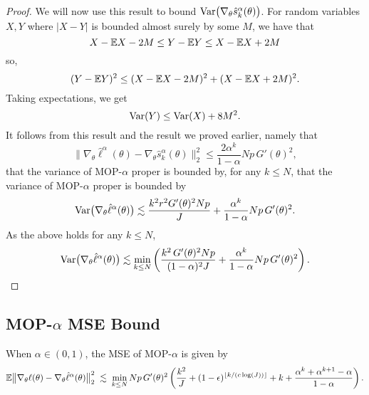 \begin{proof}
We will now use this result to bound $\mathrm{Var}\big(\nabla_\theta \hat s_k^\alpha(\theta)\big)$. 
For random variables $X,Y$ where $|X-Y|$ is bounded almost surely by some $M$, we have that 
\begin{equation}
X-\mathbb{E} X - 2M \leq Y - \mathbb{E} Y \leq X - \mathbb{E} X + 2M\end{equation}
so,
\begin{equation}
(Y-\mathbb{E} Y)^2 \leq (X-\mathbb{E} X - 2M)^2 + (X-\mathbb{E} X +2M)^2.\end{equation}
Taking expectations, we get
\begin{equation}
\mathrm{Var}(Y) \leq \mathrm{Var}(X) + 8M^2.
\end{equation}
It follows from this result and the result we proved earlier, namely that
\begin{equation}
\big\|\nabla_\theta\hat\ell^\alpha(\theta) - \nabla_\theta \hat s_k^\alpha(\theta)\big\|_2^2 \leq \frac{2\alpha^k}{1-\alpha}Np \, G'(\theta)^2,
\end{equation}
that the variance of MOP-$\alpha$ proper is bounded by, for any $k \leq N$,
that the variance of MOP-$\alpha$ proper is bounded by
\begin{equation}
\mathrm{Var}\big(\nabla_\theta \hat\ell^\alpha(\theta)\big) \lesssim \frac{k^2r^2G'(\theta)^2Np}{J} + \frac{\alpha^{k}}{1-\alpha}Np \, G'(\theta)^2.
\end{equation}
As the above holds for any $k \leq N$,
\begin{equation}
\mathrm{Var}\big(\nabla_\theta \hat\ell^\alpha(\theta)\big) \lesssim \min_{k\leq N} \left(\frac{k^2 \, G'(\theta)^2Np}{(1-\alpha)^2J} + \frac{\alpha^{k}}{1-\alpha}Np \, G'(\theta)^2 \right).\end{equation}
\end{proof}


\subsection{MOP-$\alpha$ MSE Bound}

\begin{thm}
    When $\alpha \in (0,1)$, the MSE of MOP-$\alpha$ is given by
    \begin{equation}
        \mathbb{E}\big\|\nabla_\theta\ell(\theta) - \nabla_\theta \hat\ell^\alpha(\theta)\big\|_2^2 \; \lesssim \; \min_{k \leq N} Np \, G'(\theta)^2\left(\frac{k^2}{J}+(1-\epsilon)^{\lfloor k/(c\log(J)) \rfloor}+k+\frac{\alpha^k  + \alpha^{k+1} - \alpha}{1-\alpha}\right).
    \end{equation}
\end{thm}

